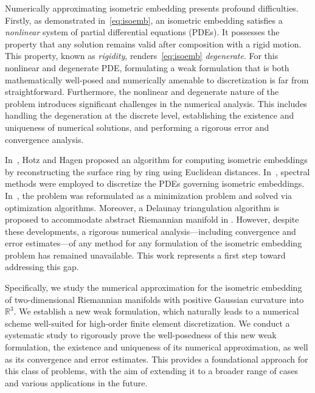 \documentclass[11pt,a4paper,oneside,reqno]{amsart}
\theoremstyle{definition}
\theoremstyle{plain}
\numberwithin{theorem}{section}
\numberwithin{proposition}{section}
\numberwithin{lemma}{section}
\numberwithin{equation}{section}
\begin{document}
Numerically approximating isometric embedding presents profound difficulties. Firstly, as demonstrated in~\eqref{eq:isoemb}, an isometric embedding satisfies a \emph{nonlinear} system of partial differential equations (PDEs). It possesses the property that any solution remains valid after composition with a rigid motion. This property, known as \emph{rigidity}, renders~\eqref{eq:isoemb} \emph{degenerate}.
For this nonlinear and degenerate PDE, formulating a weak formulation that is both mathematically well-posed and numerically amenable to discretization is far from straightforward.
Furthermore, the nonlinear and degenerate nature of the problem introduces significant challenges in the numerical analysis. This includes handling the degeneration at the discrete level, establishing the existence and uniqueness of numerical solutions, and performing a rigorous error and convergence analysis.

In~\cite{hotz2004isometric}, Hotz and Hagen proposed an algorithm for computing isometric embeddings by reconstructing the surface ring by ring using Euclidean distances. In~\cite{jasiulek2012isometric,tichy2014new}, spectral methods were employed to discretize the PDEs governing isometric embeddings. In~\cite{ray2015adiabatic,chern2018shape,bondarescu2002isometric}, the problem was reformulated as a minimization problem and solved via optimization algorithms. Moreover, a Delaunay triangulation algorithm is proposed to accommodate abstract Riemannian manifold in \cite{boissonnat2018delaunay}. However, despite these developments, a rigorous numerical analysis---including convergence and error estimates---of any method for any formulation of the isometric embedding problem has remained unavailable. This work represents a first step toward addressing this gap. 

Specifically, we study the numerical approximation for the isometric embedding of two-dimensional Riemannian manifolds with positive Gaussian curvature into \( \mathbb{R}^3 \). We establish a new weak formulation, which naturally leads to a numerical scheme well-suited for high-order finite element discretization. We conduct a systematic study to rigorously prove the well-posedness of this new weak formulation, the existence and uniqueness of its numerical approximation, as well as its convergence and error estimates.
This provides a foundational approach for this class of problems, with the aim of extending it to a broader range of cases and various applications in the future.
\end{document}
